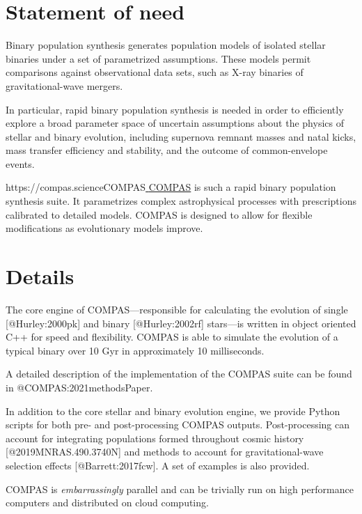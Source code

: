 \documentclass[10pt,a4paper,onecolumn]{article}
\makeatletter
\let\href@Orig=\href
\def\href@Urllike#1#2{\href@Orig{#1}{\begingroup
    \def\Url@String{#2}\Url@FormatString
    \endgroup}}
\def\href@Notdoi#1#2{\def\tempa{#1}\def\tempb{#2}%
  \ifx\tempa\tempb\relax\href@Urllike{#1}{#2}\else
  \href@Orig{#1}{#2}\fi}
\def\href#1#2{%
  \IfBeginWith{#1}{https://doi.org}%
  {\href@Urllike{#1}{#2}}{\href@Notdoi{#1}{#2}}}
\makeatother
\begin{document}
\hypertarget{statement-of-need}{%
\section{Statement of need}\label{statement-of-need}}

Binary population synthesis generates population models of isolated
stellar binaries under a set of parametrized assumptions. These models
permit comparisons against observational data sets, such as X-ray
binaries of gravitational-wave mergers.

In particular, rapid binary population synthesis is needed in order to
efficiently explore a broad parameter space of uncertain assumptions
about the physics of stellar and binary evolution, including supernova
remnant masses and natal kicks, mass transfer efficiency and stability,
and the outcome of common-envelope events.

\href{https://compas.science}{COMPAS} is such a rapid binary population
synthesis suite. It parametrizes complex astrophysical processes with
prescriptions calibrated to detailed models. COMPAS is designed to allow
for flexible modifications as evolutionary models improve.

\hypertarget{details}{%
\section{Details}\label{details}}

The core engine of COMPAS---responsible for calculating the evolution of
single {[}@Hurley:2000pk{]} and binary {[}@Hurley:2002rf{]} stars---is
written in object oriented C++ for speed and flexibility. COMPAS is able
to simulate the evolution of a typical binary over 10 Gyr in
approximately 10 milliseconds.

A detailed description of the implementation of the COMPAS suite can be
found in @COMPAS:2021methodsPaper.

In addition to the core stellar and binary evolution engine, we provide
Python scripts for both pre- and post-processing COMPAS outputs.
Post-processing can account for integrating populations formed
throughout cosmic history {[}@2019MNRAS.490.3740N{]} and methods to
account for gravitational-wave selection effects {[}@Barrett:2017fcw{]}.
A set of examples is also provided.

COMPAS is \emph{embarrassingly} parallel and can be trivially run on
high performance computers and distributed on cloud computing.
\end{document}
